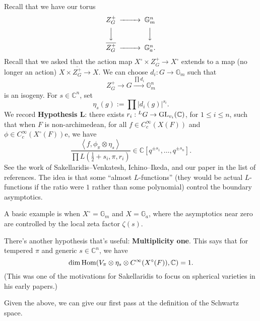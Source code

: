 \documentclass[reqno]{amsart} 
\numberwithin{theorem}{section}
\numberwithin{equation}{section}
\numberwithin{exercise}{section}
\begin{document}
Recall that we have our torus
\begin{equation*}
  \begin{CD}         
    Z_G^+    @>>> \mathbb{G}_m^n\\
    @VVV  @VVV \\
    \overline{Z_G^+}    @>>> \mathbb{G}_a^n. \\
  \end{CD}
\end{equation*}
Recall that we asked that the action map  $X^{\circ} \times Z^+_G \rightarrow X^{\circ}$ extends to a map (no longer an action) $X \times \overline{Z_G^+} \rightarrow X$.  We can choose $d_i : G \rightarrow \mathbb{G}_m$ such that
\begin{equation*}
  Z_G^+ \rightarrow G \xrightarrow{\prod  d_i} \mathbb{G}_m^n
\end{equation*}
is an isogeny.  For $s \in \mathbb{C}^n$, set
\begin{equation*}
  \eta_s(g) := \prod \lvert d_i(g) \rvert^{s_i}.
\end{equation*}
We record \textbf{Hypothesis L}: there exists $r_i :{}^L G \rightarrow \operatorname{GL}_{v_i}(\mathbb{C})$, for $1 \leq i \leq n$, such that when $F$ is non-archimedean, for all $f \in C_c^\infty(X(F))$ and $\phi \in C_c^\infty(X^{\circ}(F))$e, we have
\begin{equation*}
  \frac{\left\langle f, \phi_\pi \otimes \eta_s \right\rangle}{\prod L(\tfrac{1}{2} + s_i, \pi, r_i)} \in \mathbb{C}[q^{\pm s_1}, \dotsc, q^{\pm s_n}].
\end{equation*}
See the work of Sakellaridis--Venkatesh, Ichino--Ikeda, and our paper in the list of references.  The idea is that some ``almost $L$-functions'' (they would be actual $L$-functions if the ratio were $1$ rather than some polynomial) control the boundary asymptotics.

A basic example is when $X^{\circ} = \mathbb{G}_m$ and $X = \mathbb{G}_a$, where the asymptotics near zero are controlled by the local zeta factor $\zeta(s)$.

There's another hypothesis that's useful: \textbf{Multiplicity one}.  This says that for tempered $\pi$ and generic $s \in \mathbb{C}^n$, we have
\begin{equation*}
  \dim \operatorname{Hom}(V_\pi \otimes \eta_s \otimes C^\infty(X^{\circ}(F)), \mathbb{C}) = 1.
\end{equation*}
(This was one of the motivations for Sakellaridis to focus on spherical varieties in his early papers.)

Given the above, we can give our first pass at the definition of the Schwartz space.  
\end{document}
